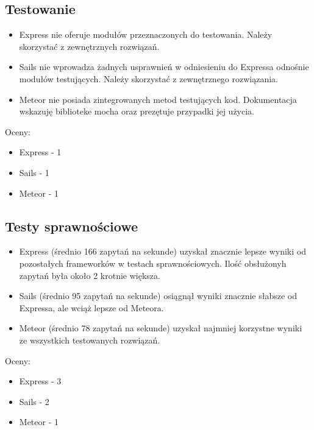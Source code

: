 \documentclass[12pt]{report}
\begin{document}
    \subsection{Testowanie}
      \begin{itemize}
        \item Express nie oferuje modułów przeznaczonych do testowania. Należy skorzystać z zewnętrznych rozwiązań.
        \item Sails nie wprowadza żadnych usprawnień w odniesieniu do Expressa odnośnie modułów testujących. Należy skorzystać z zewnętrznego rozwiązania.
        \item Meteor nie posiada zintegrowanych metod testujących kod. Dokumentacja wskazuję biblioteke mocha oraz prezętuje przypadki jej użycia.
      \end{itemize}
      Oceny:
      \begin{itemize}
        \item Express - 1
        \item Sails - 1
        \item Meteor - 1
      \end{itemize}
      
    \subsection{Testy sprawnościowe}
      \begin{itemize}
        \item Express (średnio 166 zapytań na sekunde) uzyskał znacznie lepsze wyniki od pozostałych frameworków w testach sprawnościowych. Ilość obsłużonyh zapytań była około 2 krotnie większa.
        \item Sails (średnio 95 zapytań na sekunde) osiągnął wyniki znacznie słabsze od Expressa, ale wciąż lepsze od Meteora.
        \item Meteor (średnio 78 zapytań na sekunde) uzyskał najmniej korzystne wyniki ze wszystkich testowanych rozwiązań.
      \end{itemize}
      Oceny:
      \begin{itemize}
        \item Express - 3
        \item Sails - 2
        \item Meteor - 1
      \end{itemize}
      
\end{document}
